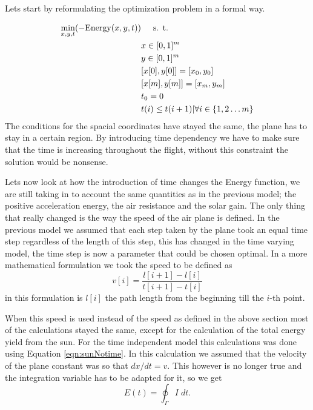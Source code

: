 \documentclass[ twoside,openright,titlepage,numbers=noenddot,headinclude,%
                footinclude=true,cleardoublepage=empty,abstractoff, %
                BCOR=5mm,paper=a4,fontsize=11pt,%
                ngerman,american,%
                ]{scrreprt}
\begin{document}
Lets start by reformulating the optimization problem in a formal way.

\begin{align}
       \min_{x,y,t }( -\text{Energy}(x,y,t)) & \hspace{5mm}  \text{s. t. } \\
		& x \in [0,1]^m\\
		& y \in [0,1]^m\\
		& [x[0],y[0]] = [x_0,y_0] \\
		& [x[m],y[m]] = [x_m,y_m] \\
		& t_0 = 0\\
		& t(i) \leq t(i+1)| \forall i \in \left\{1,2 \dots m\right\}
\end{align}
The conditions for the spacial coordinates have stayed the same, the plane has to stay in a certain region.
By introducing time dependency we have to make sure that the time is increasing throughout the flight, without this constraint the solution would be nonsense.

Lets now look at how the introduction of time changes the Energy function, we are still taking in to account the same quantities as in the previous model; the positive acceleration energy, the air resistance and the solar gain.
The only  thing that really changed is the way the speed of the air plane is defined.
In the previous model we assumed that each step taken by the plane took an equal time step regardless of the length of this step, this has changed in the time varying model, the time step is now a parameter that could be chosen optimal.
In a more mathematical formulation we took the speed to be defined as
\begin{equation}
v[i] = \dfrac{l[i+1]-l[i]}{t[i+1]-t[i]}
\end{equation}
in this formulation is $ l[i] $ the path length  from the beginning till the $i$-th point.

When this speed is used instead of the speed as defined in the above section most of the calculations stayed the same, except for the calculation of the total energy yield from the sun.
For the time independent model this calculations was done using Equation \ref{eqn:sunNotime}.
In this calculation we assumed that the velocity of the plane  constant was so that $ dx/ dt = v $.
This however is no longer true and the integration variable has to be adapted for it, so we get
\begin{equation} \label{eqn:sunNotime}
E(t) = \oint_{\Gamma} I  \; dt.
\end{equation}
\end{document}
